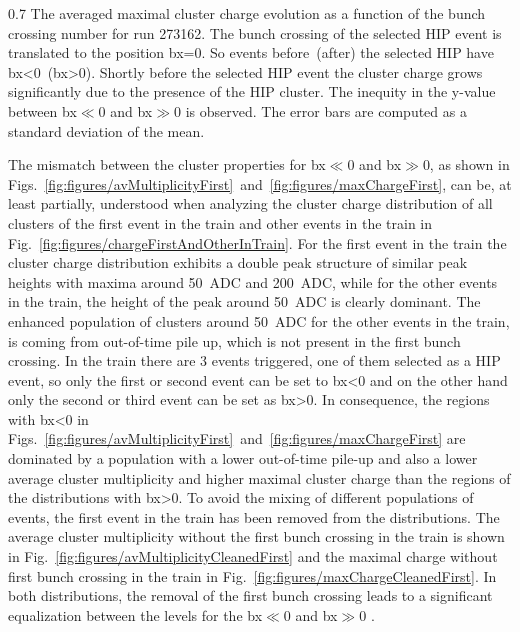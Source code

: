                  {0.7}       %
                 {The averaged maximal cluster charge evolution as a function of the bunch crossing number for run 273162. The bunch crossing of the selected HIP event is translated to the position bx=0. So events before~(after) the selected HIP have bx<0~(bx>0).  Shortly before the selected HIP event the cluster charge grows significantly due to the presence of the HIP cluster. The inequity in the y-value between bx$\ll$0 and bx$\gg$0 is observed. The error bars are computed as a standard deviation of the mean. } %

The mismatch between the cluster properties for bx$\ll$0 and bx$\gg$0, as shown in Figs.~\ref{fig:figures/avMultiplicityFirst}~and~\ref{fig:figures/maxChargeFirst}, can be, at least partially, understood when analyzing the cluster charge distribution of all clusters of the first event in the train and other events in the train in Fig.~\ref{fig:figures/chargeFirstAndOtherInTrain}. For the first event in the train the cluster charge distribution exhibits a double peak structure of similar peak heights with maxima around 50~ADC and 200~ADC, while for the other events in the train, the height of the peak around 50~ADC is clearly dominant. The enhanced population of clusters around 50~ADC for the other events in the train, is coming from out-of-time pile up, which is not present in the first bunch crossing. In the train there are 3 events triggered, one of them selected as a HIP event, so only the first or second event can be set to bx<0 and on the other hand only the second or third event can be set as bx>0. In consequence, the regions with bx<0 in Figs.~\ref{fig:figures/avMultiplicityFirst}~and~\ref{fig:figures/maxChargeFirst} are dominated by a population with a lower out-of-time pile-up and also a lower average cluster multiplicity and higher maximal cluster charge than the regions of the distributions with bx>0. To avoid the mixing of different populations of events, the first event in the train has been removed from the distributions. The average cluster multiplicity without the first bunch crossing in the train is shown in Fig.~\ref{fig:figures/avMultiplicityCleanedFirst} and the maximal charge without first bunch crossing in the train in Fig.~\ref{fig:figures/maxChargeCleanedFirst}. In both distributions, the removal of the first bunch crossing leads to a significant equalization between the levels for the bx$\ll$0 and bx$\gg$0 .

